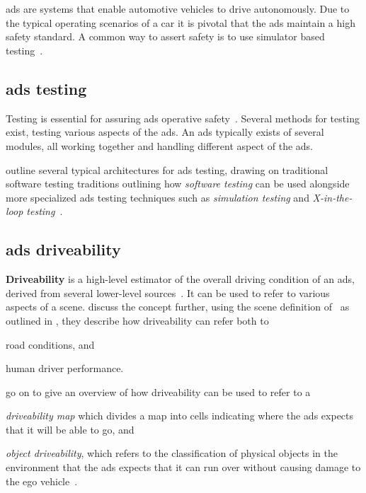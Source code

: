 \section{}

\acrfull{ads} are systems that enable automotive vehicles to drive autonomously. Due to the typical
operating scenarios of a car it is pivotal that the \acrlong{ads} maintain a high safety standard. A
common way to assert safety is to use simulator based testing~\cite[1]{DeepScenario}.

\subsection{\acrlong{ads} testing}

Testing is essential for assuring \acrlong{ads} operative safety~\cite[163]{ADTestingReview16}.
Several methods for testing exist, testing various aspects of the \acrlong{ads}. An \acrshort{ads}
typically exists of several modules, all working together and handling different aspect of the
\acrlong{ads}.

\citeauthor{ADTestingReview16} outline several typical architectures for \acrshort{ads} testing,
drawing on traditional software testing traditions outlining how \textit{software testing} can be
used alongside more specialized \acrshort{ads} testing techniques such as \textit{simulation
    testing} and \textit{X-in-the-loop testing}~\cite[163-164]{ADTestingReview16}.

\subsection{\acrlong{ads} driveability}\label{sec:adsDrivability}

\textbf{Driveability} is a high-level estimator of the overall driving
condition of an \acrshort{ads}, derived from several lower-level sources~\cite[3140]{safeToDrive}.
It can be used to refer to various aspects of a scene.
\citeauthor{safeToDrive} discuss the concept further, using the  scene definition
of~\citeauthor{scenes} as outlined in  , they describe
how driveability can refer both to \begin{inparaenum}
    \item road conditions, and
    \item human driver performance.
\end{inparaenum}
\citeauthor{safeToDrive} go on to give an overview of how driveability
can be used to refer to a \begin{inparaenum}\setcounter{enumi}{2}
    \item \textit{driveability map} which divides a map into
    cells indicating where the \acrshort{ads} expects that it will be able to go, and
    \item \textit{object driveability}, which refers to the classification of physical objects in
    the environment that the \acrshort{ads} expects that it can run over without causing damage to
    the ego vehicle~\cite[3135-3136]{safeToDrive}.
\end{inparaenum}

